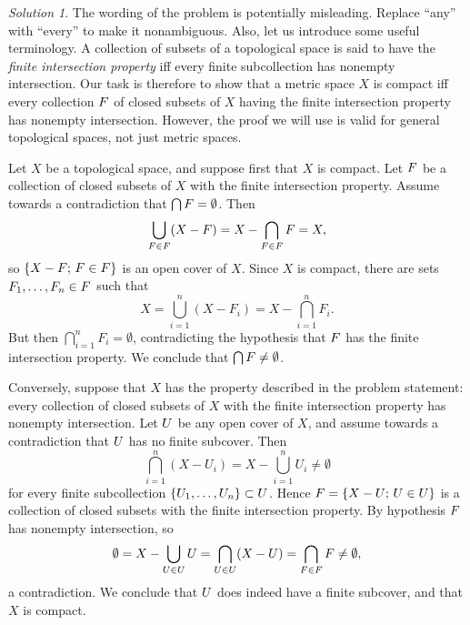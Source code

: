 \documentclass{report}
\let\sc\relax
\newcommand{\sc}[1]{\mathscr{#1}}
\theoremstyle{remark}
\newtheorem*{solution}{Solution}
\begin{document}
\begin{solution}
  The wording of the problem is potentially misleading. Replace ``any'' with ``every'' to make it nonambiguous. Also, let us introduce some useful terminology. A collection of subsets of a topological space is said to have the \emph{finite intersection property} iff every finite subcollection has nonempty intersection. Our task is therefore to show that a metric space $X$ is compact iff every collection $\sc F$ of closed subsets of $X$ having the finite intersection property has nonempty intersection. However, the proof we will use is valid for general topological spaces, not just metric spaces.

  Let $X$ be a topological space, and suppose first that $X$ is compact. Let $\sc F$ be a collection of closed subsets of $X$ with the finite intersection property. Assume towards a contradiction that $\bigcap \sc F = \emptyset$. Then
  \begin{equation*}
    \bigcup_{F \in \sc F} (X - F) = X - \bigcap_{F \in \sc F} F = X,
  \end{equation*}
  so $\{X - F; \, F \in \sc F\}$ is an open cover of $X$. Since $X$ is compact, there are sets $F_1, \dots, F_n \in \sc F$ such that
  \begin{equation*}
    X = \bigcup_{i=1}^n (X - F_i) = X - \bigcap_{i=1}^n F_i.
  \end{equation*}
  But then $\bigcap_{i=1}^n F_i = \emptyset$, contradicting the hypothesis that $\sc F$ has the finite intersection property. We conclude that $\bigcap \sc F \ne \emptyset$.

  Conversely, suppose that $X$ has the property described in the problem statement: every collection of closed subsets of $X$ with the finite intersection property has nonempty intersection. Let $\sc U$ be any open cover of $X$, and assume towards a contradiction that $\sc U$ has no finite subcover. Then
  \begin{equation*}
    \bigcap_{i=1}^n (X - U_i) = X - \bigcup_{i=1}^n U_i \ne \emptyset
  \end{equation*}
  for every finite subcollection $\{U_1, \dots, U_n\} \subset \sc U$. Hence $\sc F = \{X - U; \, U \in \sc U\}$ is a collection of closed subsets with the finite intersection property. By hypothesis $\sc F$ has nonempty intersection, so
  \begin{equation*}
    \emptyset = X - \bigcup_{U \in \sc U} U = \bigcap_{U \in \sc U} (X - U) = \bigcap_{F \in \sc F} F \ne \emptyset,
  \end{equation*}
  a contradiction. We conclude that $\sc U$ does indeed have a finite subcover, and that $X$ is compact.
\end{solution}
\end{document}
